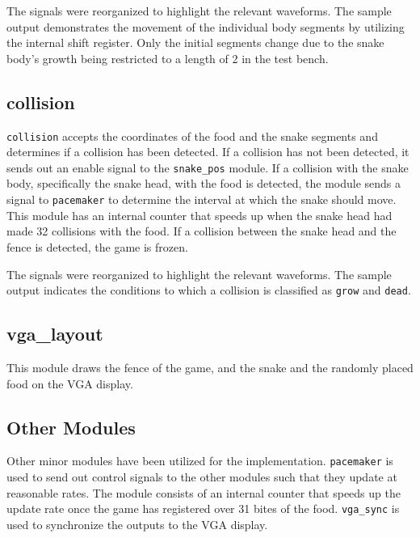 \documentclass[paper=usletter, fontsize=12pt]{article}
\begin{document}
        The signals were reorganized to highlight the relevant waveforms. The
        sample output demonstrates the movement of the individual body segments
        by utilizing the internal shift register. Only the initial segments
        change due to the snake body's growth being restricted to a length of 2
        in the test bench.

        \subsection{collision} \texttt{collision} accepts the coordinates of
        the food and the snake segments and determines if a collision has been
        detected. If a collision has not been detected, it sends out an enable
        signal to the \texttt{snake\_pos} module. If a collision with the snake
        body, specifically the snake head, with the food is detected, the
        module sends a signal to \texttt{pacemaker} to determine the interval
        at which the snake should move. This module has an internal counter
        that speeds up when the snake head had made 32 collisions with the
        food. If a collision between the snake head and the fence is detected,
        the game is frozen.


        The signals were reorganized to highlight the relevant waveforms. The
        sample output indicates the conditions to which a collision is
        classified as \texttt{grow} and \texttt{dead}.

        \subsection{vga\_layout} This module draws the fence of the game, and
        the snake and the randomly placed food on the VGA display.

        \subsection{Other Modules} Other minor modules have been utilized for
        the implementation. \texttt{pacemaker} is used to send out control
        signals to the other modules such that they update at reasonable rates.
        The module consists of an internal counter that speeds up the update
        rate once the game has registered over 31 bites of the food.
        \texttt{vga\_sync} is used to synchronize the outputs to the VGA
        display.
\end{document}
